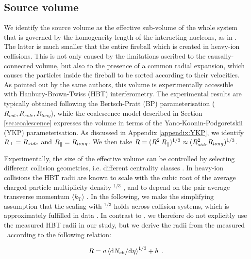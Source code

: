 \subsection{Source volume}
\label{SecSourceVolume}
We identify the source volume as the effective sub-volume of the whole system that is governed by the homogeneity length of the interacting nucleons, as in \cite{Scheibl:1998tk}. 
The latter is much smaller that the entire fireball which is created in heavy-ion collisions. 
This is not only caused by the limitations ascribed to the causally-connected volume, but also to the presence of a common radial expansion, which causes the particles inside the fireball to be sorted according to their velocities.
As pointed out by the same authors, this volume is experimentally accessible with Hanbury-Brown-Twiss (HBT) interferometry. 
The experimental results are typically obtained following the Bertsch-Pratt (BP) parameterisation ($R_{out}, R_{side}, R_{long}$), while the coalescence model described in Section \ref{sec:coalescence} expresses the volume in terms of the Yano-Koonin-Podgoretskii (YKP) parameterisation. 
As discussed in Appendix \ref{appendix:YKP}, we identify $R_{\perp} = R_{side}$ and $R_{\|} = R_{long}$. We then take $R = (R_{\perp}^{2}R_{\|})^{1/3} \approx (R_{side}^{2}R_{long})^{1/3}$.

Experimentally, the size of the effective volume can be controlled by selecting different collision geometries, i.e. different centrality classes \cite{Abelev:2013qoq}. In heavy-ion collisions the HBT radii are known to scale with the cubic root of the average charged particle multiplicity density \avdNdeta$^{1/3}$ \cite{Adam:2015vna}, and to depend on the pair average transverse momentum $\langle k_{\mathrm{T}}\rangle$ \cite{Aamodt:2011mr}. In the following, we make the simplifying assumption that the scaling with \avdNdeta$^{1/3}$ holds across collision systems, which is approximately fulfilled in data \cite{Adam:2015pya}. In contrast to \cite{Blum:2017qnn}, we therefore do not explicitly use the measured HBT radii in our study, but we derive the radii from the measured \avdNdeta~according to the following relation:

\begin{equation}
R = a \left<\mathrm{d}N_\mathrm{ch}/\mathrm{d}\eta\right>^{1/3} + b \;\;.
\label{eq:radiusParameterisation}
\end{equation}

